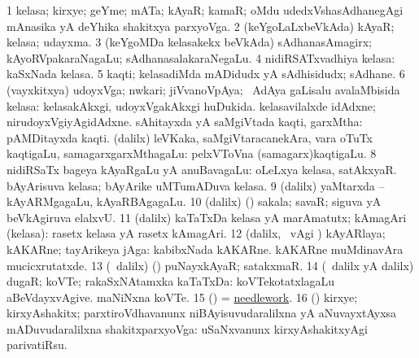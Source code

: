 \begin{center}
\bentry
{} 
\gl{\nA}
\expl{}
\bmng
\bnum
\num{1} kelasa; kirxye; geYme; mATa; kAyaR; kamaR; oMdu udedxVshasAdhanegAgi mAnasika yA deYhika shakitxya parxyoVga. 
\num{2} (keYgoLaLxbeVkAda) kAyaR; kelasa; udayxma. 
\num{3} (keYgoMDa kelasakekx beVkAda) sAdhanasAmagirx; kAyoRVpakaraNagaLu; sAdhanasalakaraNegaLu. 
\num{4} nidiRSATxvadhiya kelasa:  kaSxNada kelasa. 
\num{5} kaqti; kelasadiMda mADidudx yA sAdhisidudx; sAdhane. 
\num{6} (vayxkitxya) udoyxVga; nwkari; jiVvanoVpAya; \kanmu\ AdAya gaLisalu avalaMbisida kelasa:  kelasakAkxgi, udoyxVgakAkxgi huDukida.  kelasavilalxde idAdxne; nirudoyxVgiyAgidAdxne. 
\banum
{} sAhitayxda yA saMgiVtada kaqti, garxMtha:  pAMDitayxda kaqti. 
 (\bava dalilx) leVKaka, saMgiVtaracanekAra, \mo vara oTuTx kaqtigaLu, samagarxgarxMthagaLu:  pelxVToVna (samagarx)kaqtigaLu. 
\eanum
\numie
\num{8} nidiRSaTx bageya kAyaRgaLu yA anuBavagaLu:  oLeLxya kelasa, satAkxyaR.  bAyArisuva kelasa; bAyArike uMTumADuva kelasa. 
\num{9} (\bava dalilx) yaMtarxda -- kAyARMgagaLu, kAyaRBAgagaLu. 
\num{10} (\bava dalilx) (\AmA) sakala; savaR; siguva yA beVkAgiruva elalxvU. 
\num{11} (\bava dalilx) kaTaTxDa kelasa yA marAmatutx; kAmagAri (kelasa):  rasetx kelasa yA rasetx kAmagAri. 
\num{12} (\bava dalilx, \sA\ \Eva vAgi \parx) kAyARlaya; kAKARne; tayArikeya jAga:  kabibxNada kAKARne.  kAKARne muMdinavAra mucicxrutatxde. 
\num{13} (\sA\ \bava dalilx) (\deVva) puNayxkAyaR; satakxmaR. 
\num{14} (\sA\ \bava dalilx yA \saMpa dalilx) dugaR; koVTe; rakaSxNAtamxka kaTaTxDa:  koVTekotatxlagaLu aBeVdayxvAgive.  maNiNxna koVTe. 
\num{15} (\pArxparx) = \hyperref{kandict_n.pdf}{N}{needlework}{needlework}. 
\num{16} (\Bwvi) kirxye; kirxyAshakitx; parxtiroVdhavanunx niBAyisuvudaralilxna yA aNuvayxtAyxsa mADuvudaralilxna shakitxparxyoVga:  uSaNxvanunx kirxyAshakitxyAgi parivatiRsu. 
\enum
\emng


\end{center}
